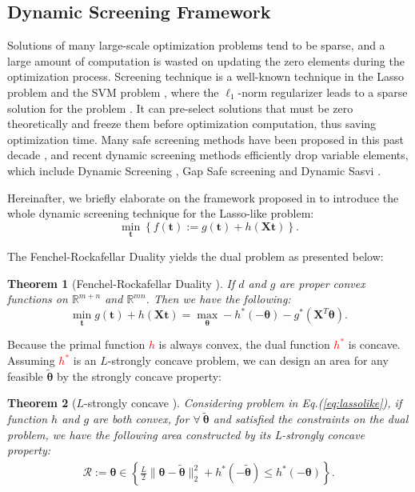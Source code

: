 \documentclass[twoside]{article}
\theoremstyle{plain}
\newtheorem{thm}{Theorem}
\newcommand{\mat}[1]{\mathbf{#1}}
\renewcommand{\vec}[1]{\bm{#1}}
\newcommand{\changeHK}[1]{\textcolor{red}{#1}}
\begin{document}
\subsection{Dynamic Screening Framework}
Solutions of many large-scale optimization problems tend to be sparse, and a large amount of computation is wasted on updating the zero elements during the optimization process. Screening technique is a well-known technique in the Lasso problem and the SVM problem \citep{Ogawa_ICML_2013}, where the $\ell_1$-norm regularizer leads to a sparse solution for the problem \citep{ghaoui2010safe}. It can pre-select solutions that must be zero theoretically and freeze them before optimization computation, thus saving optimization time. Many safe screening methods have been proposed in this past decade \citep{Liu_ICML_2014,Wang_JMLR_2015}, and recent dynamic screening methods efficiently drop variable elements, which include Dynamic Screening \citep{7128732}, Gap Safe screening \citep{JMLR:v18:16-577} and Dynamic Sasvi \citep{Yamada_NIPS_2021}.

Hereinafter, we briefly elaborate on the framework proposed in \citep{Yamada_NIPS_2021} to introduce the whole dynamic screening technique for the Lasso-like problem:
\begin{equation}
\label{eq:lassolike}
\min_{\vec{t}} \left\{ f(\vec{t}) := g(\vec{t}) + h(\mat{X} \vec{t}) \right\}.
\end{equation}

The Fenchel-Rockafellar Duality yields the dual problem as presented below:
\begin{thm}[Fenchel-Rockafellar Duality {\citep{Rockafellar_Springer_1998}}] 
\label{Thm:FRD}
If $d$ and $g$ are proper convex functions on $\mathbb{R}^{m+n}$ and $\mathbb{R}^{mn}$. Then we have the following:
\begin{equation}
\label{Eq:FRD}
\min_{\vec{t}} g(\vec{t}) + h(\mat{X}\vec{t}) = \max_{\vec{\vec{\theta}}} -h^*(-\vec{\theta})-g^*(\mat{X}^T\vec{\theta}).
\end{equation}
\end{thm}

Because the primal function \changeHK{$h$} is always convex, the dual function \changeHK{$h^*$} is concave. Assuming \changeHK{$h^*$} is an $L$-strongly concave problem, we can design an area for any feasible $\tilde{\vec{\theta}}$ by the strongly concave property:

\begin{thm}[$L$-strongly concave {\citep[Theorem 5]{Yamada_NIPS_2021}}]
\label{thm:circle}
Considering problem in Eq.(\ref{eq:lassolike}), if function $h$ and $g$ are both convex, for $\forall \ \tilde{\vec{\theta}}$ and satisfied the constraints on the dual problem, we have the following area constructed by its L-strongly concave property:  
$$
\begin{aligned}
\mathcal{R}:=\vec{\theta} \in \left\{\frac{L}{2}\|\vec{\theta}-\tilde{\vec{\theta}}\|_2^2+h^*(-\tilde{\vec{\theta}}) \leq h^*(-\vec{\theta})\right\}.
\end{aligned}
$$
\end{thm}
\end{document}
